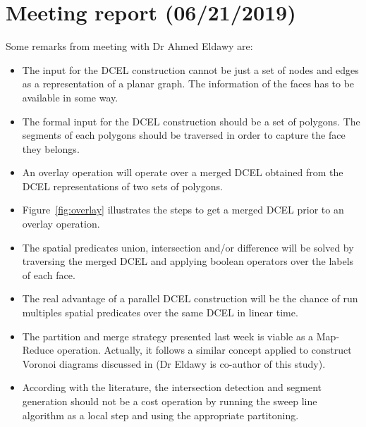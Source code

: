 \documentclass[11pt]{report}
\begin{document}
\section*{Meeting report (06/21/2019)}
Some remarks from meeting with Dr Ahmed Eldawy are:
\begin{itemize}
 \item The input for the DCEL construction cannot be just a set of nodes and edges as a representation of a planar graph.  The information of the faces has to be available in some way.
 \item The formal input for the DCEL construction should be a set of polygons. The segments of each polygons should be traversed in order to capture the face they belongs.
 \item An overlay operation will operate over a merged DCEL obtained from the DCEL representations of two sets of polygons.
 \item Figure~\ref{fig:overlay} illustrates the steps to get a merged DCEL prior to an overlay operation.
 \item The spatial predicates union, intersection and/or difference will be solved by traversing the merged DCEL and applying boolean operators over the labels of each face.
 \item The real advantage of a parallel DCEL construction will be the chance of run multiples spatial predicates over the same DCEL in linear time.
 \item The partition and merge strategy presented last week is viable as a Map-Reduce operation.  Actually, it follows a similar concept applied to construct Voronoi diagrams discussed in \cite{li_scalable_2019} (Dr Eldawy is co-author of this study).
 \item According with the literature, the intersection detection and segment generation should not be a cost operation by running the sweep line algorithm as a local step and using the appropriate partitoning.
\end{itemize}
\end{document}
